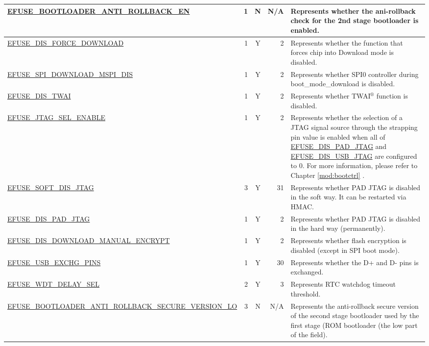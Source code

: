 \begin{longtable}[l]{ |m{8.2cm}|r|c|r|m{9cm}| }
    \hyperref[fielddesc:EFUSEBOOTLOADERANTIROLLBACKEN]{EFUSE\_BOOTLOADER\_ANTI\_ROLLBACK\_EN} & 1 & N & N/A & Represents whether the ani-rollback check for the 2nd stage bootloader is enabled. \\ \hline
    \hyperref[fielddesc:EFUSEDISFORCEDOWNLOAD]{EFUSE\_DIS\_FORCE\_DOWNLOAD} & 1 & Y & 2 & Represents whether the function that forces chip into Download mode is disabled.  \\ \hline
    \hyperref[fielddesc:EFUSESPIDOWNLOADMSPIDIS]{EFUSE\_SPI\_DOWNLOAD\_MSPI\_DIS} & 1 & Y & 2 & Represents whether SPI0 controller during boot\_mode\_download is disabled. \\ \hline
    \hyperref[fielddesc:EFUSEDISTWAI]{EFUSE\_DIS\_TWAI} & 1 & Y & 2 & Represents whether TWAI$^®$ function is disabled. \\ \hline
    \hyperref[fielddesc:EFUSEJTAGSELENABLE]{EFUSE\_JTAG\_SEL\_ENABLE} & 1 & Y & 2 & Represents whether the selection of a JTAG signal source through the strapping pin value is enabled when all of \hyperref[fielddesc:EFUSEDISPADJTAG]{EFUSE\_DIS\_PAD\_JTAG} and \hyperref[fielddesc:EFUSEDISUSBJTAG]{EFUSE\_DIS\_USB\_JTAG} are configured to 0. For more information, please refer to Chapter \ref{mod:bootctrl} \textit{\nameref{mod:bootctrl}}. \\ \hline
    \hyperref[fielddesc:EFUSESOFTDISJTAG]{EFUSE\_SOFT\_DIS\_JTAG} & 3 & Y & 31 & Represents whether PAD JTAG is disabled in the soft way. It can be restarted via HMAC.  \\ \hline
    \hyperref[fielddesc:EFUSEDISPADJTAG]{EFUSE\_DIS\_PAD\_JTAG} & 1 & Y & 2 & Represents whether PAD JTAG is disabled in the hard way (permanently). \\ \hline
    \hyperref[fielddesc:EFUSEDISDOWNLOADMANUALENCRYPT]{EFUSE\_DIS\_DOWNLOAD\_MANUAL\_ENCRYPT} & 1 & Y & 2 & Represents whether flash encryption is disabled (except in SPI boot mode). \\ \hline
    \hyperref[fielddesc:EFUSEUSBEXCHGPINS]{EFUSE\_USB\_EXCHG\_PINS} & 1 & Y & 30 & Represents whether the D+ and D- pins is exchanged. \\ \hline
    \hyperref[fielddesc:EFUSEWDTDELAYSEL]{EFUSE\_WDT\_DELAY\_SEL} & 2 & Y & 3 & Represents RTC watchdog timeout threshold. \\ \hline
    \hyperref[fielddesc:EFUSEBOOTLOADERANTIROLLBACKSECUREVERSIONLO]{EFUSE\_\-BOOTLOADER\_\-ANTI\_\-ROLLBACK\_\-SECURE\_\-VERSION\_\-LO} & 3 & N & N/A & Represents the anti-rollback secure version of the second stage bootloader used by the first stage (ROM bootloader (the low part of the field).  \\ \hline

\end{longtable}
